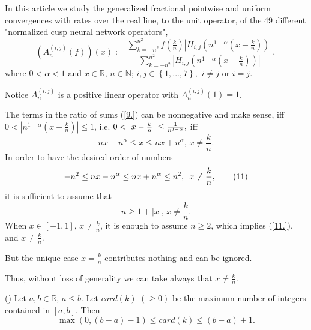 \documentclass[10pt]{NSP1}
\numberwithin{equation}{section}
\begin{document}
In this article we study the generalized fractional pointwise and uniform
convergences with rates over the real line, to the unit operator, of the 49
different "normalized cusp neural network operators",
\begin{equation}
\left( A_{n}^{\left( i,j\right) }\left( f\right) \right) \left( x\right) :=%
\frac{\sum \limits_{k=-n^{2}}^{n^{2}}f\left( \frac{k}{n}\right) \left \vert
H_{i,j}\left( n^{1-\alpha }\left( x-\frac{k}{n}\right) \right) \right \vert
}{\sum \limits_{k=-n^{2}}^{n^{2}}\left \vert H_{i,j}\left( n^{1-\alpha
}\left( x-\frac{k}{n}\right) \right) \right \vert },  \tag{9}  \label{9.}
\end{equation}
where $0<\alpha <1$ and $x\in \mathbb{R}$, $n\in \mathbb{N}$; $i,j\in
\left
\{ 1,...,7\right \} ,$ $i\neq j$ or $i=j.$

Notice $A_{n}^{\left( i,j\right) }$ is a positive linear operator with $%
A_{n}^{\left( i,j\right) }\left( 1\right) =1$.

The terms in the ratio of sums (\ref{9.}) can be nonnegative and make sense,
iff $0<\left \vert n^{1-\alpha }\left( x-\frac{k}{n}\right) \right \vert
\leq 1$, i.e. $0<\left \vert x-\frac{k}{n}\right \vert \leq \frac{1}{%
n^{1-\alpha }},$ iff
\begin{equation}
nx-n^{\alpha }\leq x\leq nx+n^{\alpha }\text{, \ }x\neq \frac{k}{n}.
\tag{10}  \label{10.}
\end{equation}
In order to have the desired order of numbers
\begin{equation}
-n^{2}\leq nx-n^{\alpha }\leq nx+n^{\alpha }\leq n^{2}\text{, \ }x\neq \frac{%
k}{n},  \tag{11}  \label{11.}
\end{equation}
it is sufficient to assume that
\begin{equation}
n\geq 1+\left \vert x\right \vert \text{, \ }x\neq \frac{k}{n}.  \tag{12}
\label{12.}
\end{equation}
When $x\in \left[ -1,1\right] $, $x\neq \frac{k}{n}$, it is enough to assume
$n\geq 2$, which implies (\ref{11.}), and $x\neq \frac{k}{n}.$

But the unique case $x=\frac{k}{n}$ contributes nothing and can be ignored.

Thus, without loss of generality we can take always that $x\neq \frac{k}{n}.$

\begin{proposition}
\label{p2}(\cite{2}) Let $a,b\in \mathbb{R}$, $a\leq b$. Let $card\left(
k\right) $ $\left( \geq 0\right) $ be the maximum number of integers
contained in $\left[ a,b\right] $. Then
\begin{equation*}
\max \left( 0,\left( b-a\right) -1\right) \leq card\left( k\right) \leq
\left( b-a\right) +1.
\end{equation*}
\end{proposition}
\end{document}
